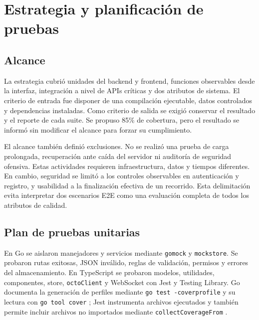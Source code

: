 \documentclass[conference]{IEEEtran}
\begin{document}
\section{Estrategia y planificación de pruebas}

\subsection{Alcance}
La estrategia cubrió unidades del backend y frontend, funciones observables desde la interfaz, integración a nivel de APIs críticas y dos atributos de sistema. El criterio de entrada fue disponer de una compilación ejecutable, datos controlados y dependencias instaladas. Como criterio de salida se exigió conservar el resultado y el reporte de cada suite. Se propuso 85\% de cobertura, pero el resultado se informó sin modificar el alcance para forzar su cumplimiento.

El alcance también definió exclusiones. No se realizó una prueba de carga prolongada, recuperación ante caída del servidor ni auditoría de seguridad ofensiva. Estas actividades requieren infraestructura, datos y tiempos diferentes. En cambio, seguridad se limitó a los controles observables en autenticación y registro, y usabilidad a la finalización efectiva de un recorrido. Esta delimitación evita interpretar dos escenarios E2E como una evaluación completa de todos los atributos de calidad.
\vspace{\baselineskip}

\subsection{Plan de pruebas unitarias}
En Go se aislaron manejadores y servicios mediante \texttt{gomock} y \texttt{mockstore}. Se probaron rutas exitosas, JSON inválido, reglas de validación, permisos y errores del almacenamiento. En TypeScript se probaron modelos, utilidades, componentes, store, \texttt{octoClient} y WebSocket con Jest y Testing Library. Go documenta la generación de perfiles mediante \texttt{go test -coverprofile} y su lectura con \texttt{go tool cover} \cite{goCoverage}; Jest instrumenta archivos ejecutados y también permite incluir archivos no importados mediante \texttt{collectCoverageFrom} \cite{jestDocs}.
\end{document}
